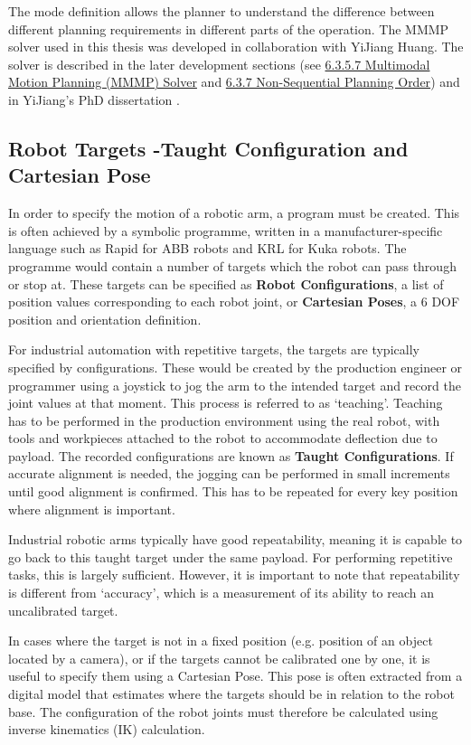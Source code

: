 The mode definition allows the planner to understand the difference between different planning requirements in different parts of the operation. The MMMP solver used in this thesis was developed in collaboration with YiJiang Huang. The solver is described in the later development sections (see \ul{6.3.5.7 Multimodal Motion Planning (MMMP) Solver} and \ul{6.3.7 Non-Sequential Planning Order}) and in YiJiang’s PhD dissertation \parencite{huangAlgorithmicPlanningRobotic2022}.

\subsection{Robot Targets -Taught Configuration and Cartesian Pose}

In order to specify the motion of a robotic arm, a program must be created. This is often achieved by a symbolic programme, written in a manufacturer-specific language such as Rapid for ABB robots and KRL for Kuka robots. The programme would contain a number of targets which the robot can pass through or stop at. These targets can be specified as \textbf{Robot Configurations}, a list of position values corresponding to each robot joint, or \textbf{Cartesian Poses}, a 6 DOF position and orientation definition.

For industrial automation with repetitive targets, the targets are typically specified by configurations. These would be created by the production engineer or programmer using a joystick to jog the arm to the intended target and record the joint values at that moment. This process is referred to as ‘teaching’. Teaching has to be performed in the production environment using the real robot, with tools and workpieces attached to the robot to accommodate deflection due to payload. The recorded configurations are known as \textbf{Taught Configurations}. If accurate alignment is needed, the jogging can be performed in small increments until good alignment is confirmed. This has to be repeated for every key position where alignment is important. 

Industrial robotic arms typically have good repeatability, meaning it is capable to go back to this taught target under the same payload. For performing repetitive tasks, this is largely sufficient. However, it is important to note that repeatability is different from ‘accuracy’, which is a measurement of its ability to reach an uncalibrated target. 

In cases where the target is not in a fixed position (e.g. position of an object located by a camera), or if the targets cannot be calibrated one by one, it is useful to specify them using a Cartesian Pose. This pose is often extracted from a digital model that estimates where the targets should be in relation to the robot base. The configuration of the robot joints must therefore be calculated using inverse kinematics (IK) calculation. 

